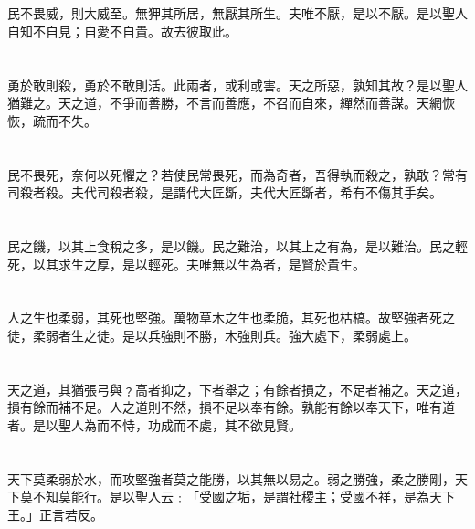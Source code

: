 \documentclass[11pt,oneside]{article}
\begin{document}
\section{}
\label{sec:orgheadline71}
民不畏威，則大威至。無狎其所居，無厭其所生。夫唯不厭，是以不厭。是以聖人自知不自見；自愛不自貴。故去彼取此。

\section{}
\label{sec:orgheadline72}
勇於敢則殺，勇於不敢則活。此兩者，或利或害。天之所惡，孰知其故？是以聖人猶難之。天之道，不爭而善勝，不言而善應，不召而自來，繟然而善謀。天網恢恢，疏而不失。

\section{}
\label{sec:orgheadline73}
民不畏死，奈何以死懼之？若使民常畏死，而為奇者，吾得執而殺之，孰敢？常有司殺者殺。夫代司殺者殺，是謂代大匠斲，夫代大匠斲者，希有不傷其手矣。

\section{}
\label{sec:orgheadline74}
民之饑，以其上食稅之多，是以饑。民之難治，以其上之有為，是以難治。民之輕死，以其求生之厚，是以輕死。夫唯無以生為者，是賢於貴生。

\section{}
\label{sec:orgheadline75}
人之生也柔弱，其死也堅強。萬物草木之生也柔脆，其死也枯槁。故堅強者死之徒，柔弱者生之徒。是以兵強則不勝，木強則兵。強大處下，柔弱處上。

\section{}
\label{sec:orgheadline76}
天之道，其猶張弓與﹖高者抑之，下者舉之；有餘者損之，不足者補之。天之道，損有餘而補不足。人之道則不然，損不足以奉有餘。孰能有餘以奉天下，唯有道者。是以聖人為而不恃，功成而不處，其不欲見賢。

\section{}
\label{sec:orgheadline77}
天下莫柔弱於水，而攻堅強者莫之能勝，以其無以易之。弱之勝強，柔之勝剛，天下莫不知莫能行。是以聖人云﹕「受國之垢，是謂社稷主；受國不祥，是為天下王。」正言若反。
\end{document}
